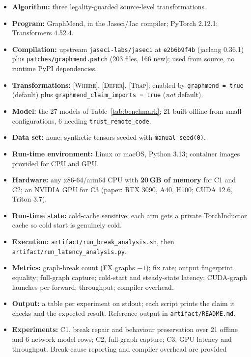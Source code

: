{\small
\begin{itemize}\itemsep0pt
  \item {\bf Algorithm:} three legality-guarded source-level transformations.
  \item {\bf Program:} GraphMend, in the Jaseci/Jac compiler; PyTorch 2.12.1;
    Transformers 4.52.4.
  \item {\bf Compilation:} upstream \texttt{jaseci-labs/jaseci} at
    \texttt{e2b6b9f4b} (jaclang 0.36.1) plus \texttt{patches/graphmend.patch}
    (203 files, 166 new); used from source, no runtime PyPI dependencies.
  \item {\bf Transformations:} \textsc{[Where]}, \textsc{[Defer]},
    \textsc{[Trap]}; enabled by \texttt{graphmend = true} (default) plus
    \texttt{graphmend\_claim\_imports = true} (\emph{not} default).
  \item {\bf Model:} the 27 models of Table~\ref{tab:benchmark}; 21 built
    offline from small configurations, 6 needing \texttt{trust\_remote\_code}.
  \item {\bf Data set:} none; synthetic tensors seeded with
    \texttt{manual\_seed(0)}.
  \item {\bf Run-time environment:} Linux or macOS, Python 3.13; container
    images provided for CPU and GPU.
  \item {\bf Hardware:} any x86-64/arm64 CPU with \textbf{20\,GB of memory} for
    C1 and C2; an NVIDIA GPU for C3 (paper: RTX
    3090, A40, H100; CUDA 12.6, Triton 3.7).
  \item {\bf Run-time state:} cold-cache sensitive; each arm gets a private
    TorchInductor cache so cold start is genuinely cold.
  \item {\bf Execution:} \texttt{artifact/run\_break\_analysis.sh}, then
    \texttt{artifact/run\_latency\_analysis.py}.
  \item {\bf Metrics:} graph-break count (FX graphs $-1$); fix rate; output
    fingerprint equality; full-graph capture; cold-start and steady-state
    latency; CUDA-graph launches per forward; throughput; compiler overhead.
  \item {\bf Output:} a table per experiment on stdout; each script prints the
    claim it checks and the expected result. Reference output in
    \texttt{artifact/README.md}.
  \item {\bf Experiments:} C1, break repair and behaviour preservation over 21
    offline and 6 network model rows; C2, full-graph capture; C3, GPU latency
    and throughput. Break-cause reporting and compiler overhead are provided

\end{itemize}}
